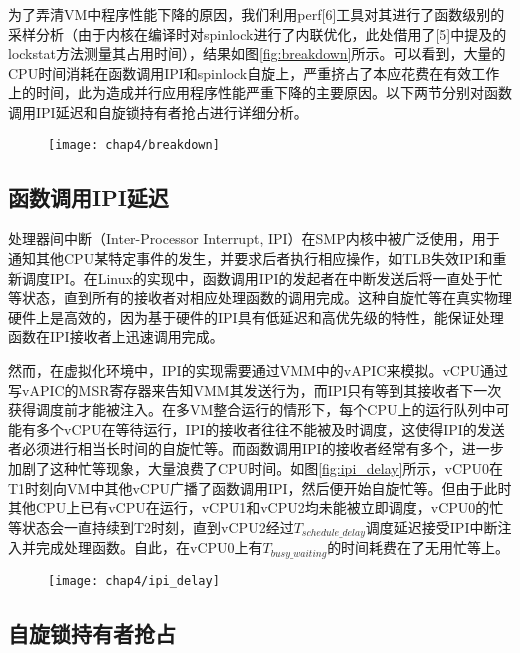 为了弄清VM中程序性能下降的原因，我们利用perf[6]工具对其进行了函数级别的采样分析（由于内核在编译时对spinlock进行了内联优化，此处借用了[5]中提及的lockstat方法测量其占用时间），结果如图\ref{fig:breakdown}所示。可以看到，大量的CPU时间消耗在函数调用IPI和spinlock自旋上，严重挤占了本应花费在有效工作上的时间，此为造成并行应用程序性能严重下降的主要原因。以下两节分别对函数调用IPI延迟和自旋锁持有者抢占进行详细分析。

\begin{figure}[!htp]
  \centering
  \texttt{[image: chap4/breakdown]}
\end{figure}

\subsection{函数调用IPI延迟}

处理器间中断（Inter-Processor Interrupt, IPI）在SMP内核中被广泛使用，用于通知其他CPU某特定事件的发生，并要求后者执行相应操作，如TLB失效IPI和重新调度IPI。在Linux的实现中，函数调用IPI的发起者在中断发送后将一直处于忙等状态，直到所有的接收者对相应处理函数的调用完成。这种自旋忙等在真实物理硬件上是高效的，因为基于硬件的IPI具有低延迟和高优先级的特性，能保证处理函数在IPI接收者上迅速调用完成。

然而，在虚拟化环境中，IPI的实现需要通过VMM中的vAPIC来模拟。vCPU通过写vAPIC的MSR寄存器来告知VMM其发送行为，而IPI只有等到其接收者下一次获得调度前才能被注入。在多VM整合运行的情形下，每个CPU上的运行队列中可能有多个vCPU在等待运行，IPI的接收者往往不能被及时调度，这使得IPI的发送者必须进行相当长时间的自旋忙等。而函数调用IPI的接收者经常有多个，进一步加剧了这种忙等现象，大量浪费了CPU时间。如图\ref{fig:ipi_delay}所示，vCPU0在T1时刻向VM中其他vCPU广播了函数调用IPI，然后便开始自旋忙等。但由于此时其他CPU上已有vCPU在运行，vCPU1和vCPU2均未能被立即调度，vCPU0的忙等状态会一直持续到T2时刻，直到vCPU2经过$T_{schedule\_delay}$调度延迟接受IPI中断注入并完成处理函数。自此，在vCPU0上有$T_{busy\_waiting}$的时间耗费在了无用忙等上。

\begin{figure}[!htp]
  \centering
  \texttt{[image: chap4/ipi\_delay]}
\end{figure}

\subsection{自旋锁持有者抢占}

